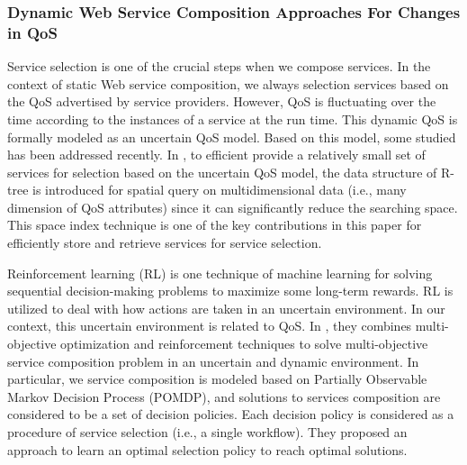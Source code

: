 \subsubsection{Dynamic Web Service Composition Approaches For Changes in QoS}\label{dynamicQoS}

Service selection is one of the crucial steps when we compose services. In the context of static Web service composition, we always selection services based on the QoS advertised by service providers. However, QoS is fluctuating over the time according to the instances of a service at the run time. This dynamic QoS is formally modeled as an uncertain QoS model. Based on this model, some studied \cite{wen2014probabilistic} has been addressed recently. In \cite{wen2014probabilistic}, to efficient provide a relatively small set of services for selection based on the uncertain QoS model, the data structure of R-tree is introduced for spatial query on multidimensional data (i.e., many dimension of QoS attributes) since it can significantly reduce the searching space. This space index technique is one of the key contributions in this paper for efficiently store and retrieve services for service selection. 

Reinforcement learning (RL) is one technique of machine learning for solving sequential decision-making problems to maximize some long-term rewards.  RL is utilized to deal with how actions are taken in an uncertain environment. In our context, this uncertain environment is related to QoS. In \cite{mostafa2015multi}, they combines multi-objective optimization and reinforcement techniques to solve multi-objective service composition problem in an uncertain and dynamic environment. In particular, we service composition is modeled based on Partially Observable Markov Decision Process (POMDP), and solutions to services composition are considered to be a set of decision policies. Each decision policy is considered as a procedure of service selection (i.e., a single workflow). They proposed an approach to learn an optimal selection policy to reach optimal solutions.

